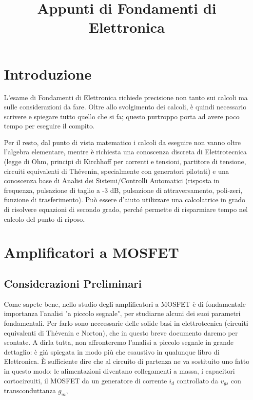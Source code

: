 \documentclass[a4paper,twocolumn,notitlepage]{book}
\begin{document}
	\onecolumn
	\title{Appunti di Fondamenti di Elettronica}
	\maketitle	
	\section*{Introduzione}
	L'esame di Fondamenti di Elettronica richiede precisione non tanto sui calcoli ma sulle considerazioni da fare.
	Oltre allo svolgimento dei calcoli, è quindi necessario scrivere e spiegare tutto quello che si fa; questo purtroppo porta ad avere poco tempo per eseguire il compito.

	Per il resto, dal punto di vista matematico i calcoli da eseguire non vanno oltre l'algebra elementare, 
	mentre è richiesta una conoscenza discreta di Elettrotecnica (legge di Ohm, principi di Kirchhoff per correnti e tensioni, partitore di tensione, circuiti equivalenti di Thévenin, specialmente con generatori pilotati) e una conoscenza base di Analisi dei Sistemi/Controlli Automatici (risposta in frequenza, pulsazione di taglio a -3 dB, pulsazione di attraversamento, poli-zeri, funzione di trasferimento). Può essere d'aiuto utilizzare una calcolatrice in grado di risolvere equazioni di secondo grado, perché permette di risparmiare tempo nel calcolo del punto di riposo.
	\newpage
	\twocolumn
	
	\section*{Amplificatori a MOSFET}
		\subsection*{Considerazioni Preliminari}	
			Come sapete bene, nello studio degli amplificatori a MOSFET è di fondamentale importanza l'analisi "a piccolo segnale", per studiarne alcuni dei suoi parametri fondamentali. 
Per farlo sono neccessarie delle solide basi in elettrotecnica (circuiti equivalenti di Thévenin e Norton), che in questo breve documento daremo per scontate. A dirla tutta, non affronteremo l'analisi a piccolo segnale in grande dettaglio: è già spiegata in modo più che esaustivo in qualunque libro di Elettronica. 
È sufficiente dire che al circuito di partenza ne va sostituito uno fatto in questo modo: le alimentazioni diventano collegamenti a massa, i capacitori cortocircuiti, il MOSFET da un generatore di corrente $i_{d}$ controllato da $v_{gs}$ con transconduttanza $g_{m}$,
\end{document}
